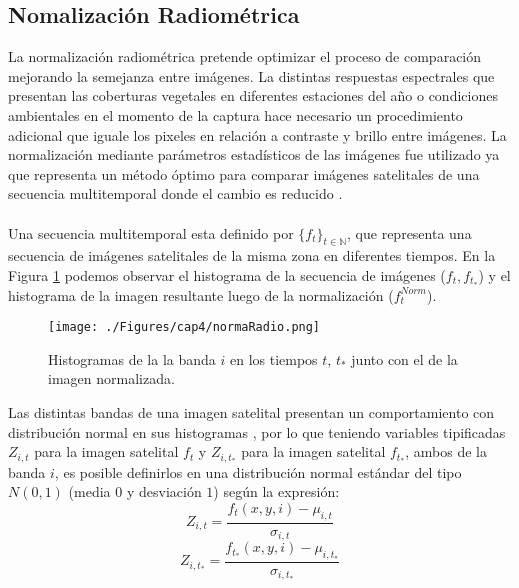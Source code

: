 \subsection{Nomalizaci\'on Radiom\'etrica}\label{sec:capNormalizacion}
La normalizaci\'on radiom\'etrica pretende optimizar el proceso de comparaci\'on mejorando la semejanza entre im\'agenes. La distintas respuestas espectrales que presentan las coberturas vegetales en diferentes estaciones del a\~{n}o o condiciones ambientales en el momento de la captura hace necesario un procedimiento adicional que iguale los pixeles en relaci\'on a contraste y brillo entre im\'agenes. La normalizaci\'on mediante par\'ametros estad\'isticos de las im\'agenes fue utilizado ya que representa un m\'etodo \'optimo para comparar im\'agenes satelitales de una secuencia multitemporal donde el cambio es reducido \cite{mateu1999comparacion}. \\~\\
Una secuencia multitemporal esta definido por $ \{f_{t}\}_{t \in \mathbb{N}} $, que representa una secuencia de im\'agenes satelitales de la misma zona en diferentes tiempos. En la Figura \ref{fig:normRadio} podemos observar el histograma de la secuencia de im\'agenes ($ f_{t},f_{t_{*}} $) y el histograma de la imagen resultante luego de la normalizaci\'on ($ f_{t}^{Norm} $).
\begin{figure}[H]
	\centering
	\texttt{[image: ./Figures/cap4/normaRadio.png]}
	\caption{Histogramas de la la banda $ i $ en los tiempos $ t $, $ t_* $ junto con el de la imagen normalizada.}
	\label{fig:normRadio}
\end{figure}
Las distintas bandas de una imagen satelital presentan un comportamiento con distribuci\'on normal en sus histogramas \cite{martinez2013normalizacion}, por lo que teniendo variables tipificadas $Z_{i,t}$ para la imagen satelital $ f_{t} $ y $Z_{i,t_{*}}$ para la imagen satelital $ f_{t_{*}}$, ambos de la banda $ i $, es posible definirlos en una distribuci\'on normal est\'andar del tipo $ N(0,1) $ (media $ 0 $ y desviaci\'on $ 1 $) seg\'un la expresión:
\begin{equation}\label{ec:zt}
Z_{i,t}=\dfrac{f_{t}(x,y,i)-\mu_{i,t}}{\sigma_{i,t}}
\end{equation}
\begin{equation}\label{ec:zt2}
Z_{i,t_{*}}=\dfrac{f_{t_{*}}(x,y,i)-\mu_{i,t_{*}}}{\sigma_{i,t_{*}}}
\end{equation}
